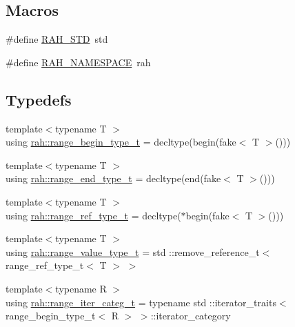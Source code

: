 \subsection*{Macros}
\begin{DoxyCompactItemize}
\item 
\#define \mbox{\hyperlink{rah_01-_01_copie_8hpp_aeff36e7cf7306f349f17e936ad105e53}{R\+A\+H\+\_\+\+S\+TD}}~std
\item 
\#define \mbox{\hyperlink{rah_01-_01_copie_8hpp_ad3a388e89994ad75cbafb263072ddfbc}{R\+A\+H\+\_\+\+N\+A\+M\+E\+S\+P\+A\+CE}}~rah
\end{DoxyCompactItemize}
\subsection*{Typedefs}
\begin{DoxyCompactItemize}
\item 
{\footnotesize template$<$typename T $>$ }\\using \mbox{\hyperlink{namespacerah_a28aff4eeddcece6be65ff0b956d32d4a}{rah\+::range\+\_\+begin\+\_\+type\+\_\+t}} = decltype(begin(fake$<$ T $>$()))
\item 
{\footnotesize template$<$typename T $>$ }\\using \mbox{\hyperlink{namespacerah_a9657e24ae477f4482225b133fe286b65}{rah\+::range\+\_\+end\+\_\+type\+\_\+t}} = decltype(end(fake$<$ T $>$()))
\item 
{\footnotesize template$<$typename T $>$ }\\using \mbox{\hyperlink{namespacerah_a6622426bea22e9509614fe4c574ebeca}{rah\+::range\+\_\+ref\+\_\+type\+\_\+t}} = decltype($\ast$begin(fake$<$ T $>$()))
\item 
{\footnotesize template$<$typename T $>$ }\\using \mbox{\hyperlink{namespacerah_a0c0c45ea6e732dc2668edfd0e4f8fccf}{rah\+::range\+\_\+value\+\_\+type\+\_\+t}} = std \+::remove\+\_\+reference\+\_\+t$<$ range\+\_\+ref\+\_\+type\+\_\+t$<$ T $>$ $>$
\item 
{\footnotesize template$<$typename R $>$ }\\using \mbox{\hyperlink{namespacerah_a7cdcceefd4c7ad3abffb96560d24517d}{rah\+::range\+\_\+iter\+\_\+categ\+\_\+t}} = typename std \+::iterator\+\_\+traits$<$ range\+\_\+begin\+\_\+type\+\_\+t$<$ R $>$ $>$\+::iterator\+\_\+category
\end{DoxyCompactItemize}

